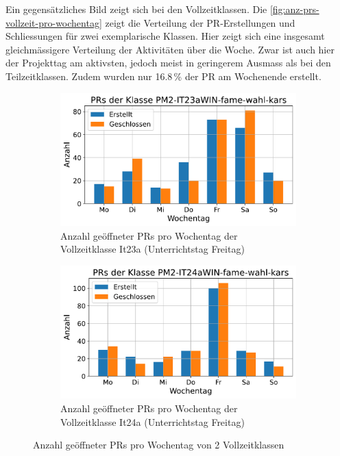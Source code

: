 Ein gegensätzliches Bild zeigt sich bei den Vollzeitklassen. Die \autoref{fig:anz-prs-vollzeit-pro-wochentag} zeigt die Verteilung der PR-Erstellungen und Schliessungen für zwei exemplarische Klassen.
Hier zeigt sich eine insgesamt gleichmässigere Verteilung der Aktivitäten über die Woche. Zwar ist auch hier der Projekttag am aktivsten, jedoch meist in geringerem Ausmass als bei den Teilzeitklassen. Zudem wurden nur 16.8\,\% der PR am Wochenende erstellt.

\begin{figure}[htbp]
    \centering
    \begin{subfigure}[b]{0.48\textwidth}
        \centering
        \includegraphics[width=\textwidth]{Figures/pr-klasse-per-wochentag-23a.pdf}
         \caption{Anzahl geöffneter PRs pro Wochentag der Vollzeitklasse It23a (Unterrichtstag Freitag)}
        \label{fig:anzahl-prs-pro-wochentag-it23a}
    \end{subfigure}
    \hfill
    \begin{subfigure}[b]{0.48\textwidth}
        \centering
        \includegraphics[width=\textwidth]{Figures/pr-klasse-per-wochentag-24a.pdf}
         \caption{Anzahl geöffneter PRs pro Wochentag der Vollzeitklasse It24a (Unterrichtstag Freitag)}
        \label{fig:anzahl-prs-pro-wochentag-it24a}
    \end{subfigure}
    \caption{Anzahl geöffneter PRs pro Wochentag von 2 Vollzeitklassen}
    \label{fig:anz-prs-vollzeit-pro-wochentag}
\end{figure}


